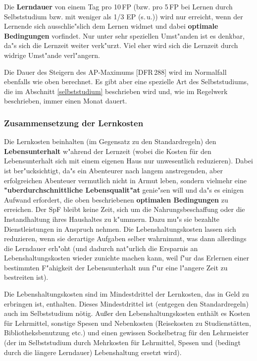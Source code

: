 \documentclass[10pt,a4paper,germanpar]{article}
\begin{document}
Die \textbf{Lerndauer} von einem Tag pro 10\,FP (bzw. pro 5\,FP bei
Lernen durch Selbststudium bzw. mit weniger als 1/3 EP (s.\,u.)) wird
nur erreicht, wenn der Lernende sich ausschlie"slich dem Lernen widmet
und dabei \textbf{optimale Bedingungen} vorfindet. Nur unter sehr
speziellen Umst"anden ist es denkbar, da"s sich die Lernzeit weiter
verk"urzt. Viel eher wird sich die Lernzeit durch widrige Umst"ande
verl"angern.

Die Dauer des Steigern des AP-Maximums [DFR\,288] wird im Normalfall ebenfalls
wie oben berechnet. Es gibt aber eine spezielle Art des Selbststudiums, die im
Abschnitt \ref{selbststudium} beschrieben wird und, wie im Regelwerk
beschrieben, immer einen Monat dauert.

\subsubsection{Zusammensetzung der Lernkosten}

Die Lernkosten beinhalten (im Gegensatz zu den Standardregeln) den
\textbf{Lebensunterhalt} w"ahrend der Lernzeit (wobei die Kosten für den
Lebensunterhalt sich mit einem eigenen Haus nur unwesentlich reduzieren).
Dabei ist ber"ucksichtigt, da"s ein Abenteurer nach langem anstregenden, aber
erfolgreichen Abenteuer vermutlich nicht in Armut leben, sondern vielmehr eine
\textbf{"uberdurchschnittliche Lebensqualit"at} genie"sen will und da"s es
einigen Aufwand erfordert, die oben beschriebenen \textbf{optimalen
  Bedingungen} zu erreichen. Der SpF bleibt keine Zeit, sich um die
Nahrungsbeschaffung oder die Instandhaltung ihres Haushaltes zu k"ummern.
Dazu mu"s sie bezahlte Dienstleistungen in Anspruch nehmen. Die
Lebenshaltungskosten lassen sich reduzieren, wenn sie derartige Aufgaben selber
wahrnimmt, was dann allerdings die Lerndauer erh"oht (und dadurch nat"urlich
die Ersparnis an Lebenshaltungskosten wieder zunichte machen kann, weil f"ur
das Erlernen einer bestimmten F"ahigkeit der Lebensunterhalt nun f"ur eine
l"angere Zeit zu bestreiten ist).

Die Lebenshaltungskosten sind im Mindestdrittel der Lernkosten, das in
Geld zu erbringen ist, enthalten. Dieses Mindestdrittel ist (entgegen
den Standardregeln) auch im Selbststudium nötig. Außer den
Lebenshaltungskosten enthält es Kosten für Lehrmittel, sonstige Spesen
und Nebenkosten (Reisekosten zu Studienstätten, Bibliotheksbenutzung
etc.) und einen gewissen Sockelbetrag für den Lehrmeister (der im
Selbststudium durch Mehrkosten für Lehrmittel, Spesen und (bedingt durch
die längere Lerndauer) Lebenshaltung ersetzt wird).
\end{document}
